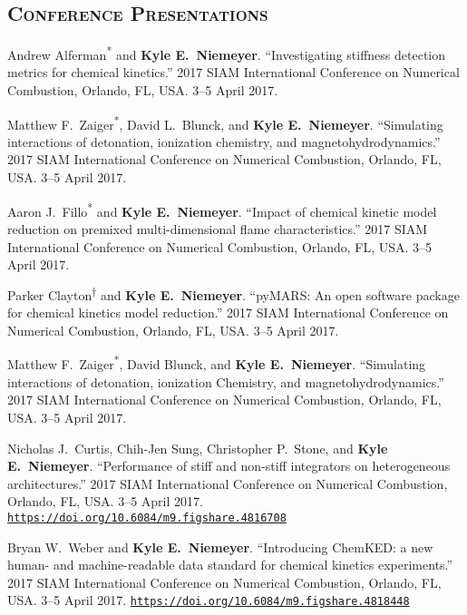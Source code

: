 \documentclass[margin,line,11pt]{res}
\makeatletter
\newlength{\bibhang}
\newlength{\bibsep}
 {\@listi \global\bibsep\itemsep \global\advance\bibsep by\parsep}
\newenvironment{bibenum*}
  {\renewcommand\labelenumi{\theenumi.}%
   \etaremune[
     topsep=0pt,
     itemsep=\bibsep,
     parsep=0pt,partopsep=0pt,
     itemindent=-\bibhang,
     leftmargin={\bibhang+\widthof{[999]}}]}
  {\endetaremune}
\newcommand*{\doi}[1]{\href{https://doi.org/#1}{\nolinkurl{https://doi.org/#1}}}
\newcommand*{\grad}[0]{\textsuperscript{*}}
\newcommand*{\ugrad}[0]{\textsuperscript{$\dagger$}}
\makeatother
\begin{document}
\begin{resume}
\section{\textsc{Conference Presentations}}

\begin{bibenum*}

\item Andrew Alferman\grad{} and \textbf{Kyle E.~Niemeyer}.
``Investigating stiffness detection metrics for chemical kinetics.''
2017 SIAM International Conference on Numerical Combustion, Orlando, FL, USA.
3--5 April 2017.

\item Matthew F.~Zaiger\grad{}, David L.~Blunck, and \textbf{Kyle E.~Niemeyer}.
``Simulating interactions of detonation, ionization chemistry, and magnetohydrodynamics.''
2017 SIAM International Conference on Numerical Combustion, Orlando, FL, USA.
3--5 April 2017.

\item Aaron J.~Fillo\grad{} and \textbf{Kyle E.~Niemeyer}.
``Impact of chemical kinetic model reduction on premixed multi-dimensional flame characteristics.''
2017 SIAM International Conference on Numerical Combustion, Orlando, FL, USA.
3--5 April 2017.

\item Parker Clayton\ugrad{} and \textbf{Kyle E.~Niemeyer}.
``pyMARS: An open software package for chemical kinetics model reduction.''
2017 SIAM International Conference on Numerical Combustion, Orlando, FL, USA.
3--5 April 2017.

\item Matthew F.~Zaiger\grad{}, David Blunck, and \textbf{Kyle E.~Niemeyer}.
``Simulating interactions of detonation, ionization Chemistry, and magnetohydrodynamics.''
2017 SIAM International Conference on Numerical Combustion, Orlando, FL, USA.
3--5 April 2017.

\item Nicholas J.~Curtis, Chih-Jen Sung, Christopher P.~Stone, and \textbf{Kyle E.~Niemeyer}.
``Performance of stiff and non-stiff integrators on heterogeneous architectures.''
2017 SIAM International Conference on Numerical Combustion, Orlando, FL, USA.
3--5 April 2017.
\doi{10.6084/m9.figshare.4816708}

\item Bryan W.~Weber and \textbf{Kyle E.~Niemeyer}.
``Introducing ChemKED: a new human- and machine-readable data standard for chemical kinetics experiments.''
2017 SIAM International Conference on Numerical Combustion, Orlando, FL, USA.
3--5 April 2017.
\doi{10.6084/m9.figshare.4818448}


\end{bibenum*}
\end{resume}
\end{document}

